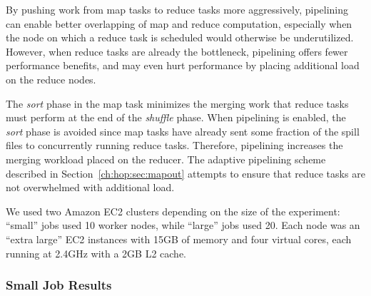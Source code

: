 By pushing work from map tasks to reduce tasks more aggressively, pipelining
can enable better overlapping of map and reduce computation, especially when
the node on which a reduce task is scheduled would otherwise be underutilized.
However, when reduce tasks are already the bottleneck, pipelining offers fewer
performance benefits, and may even hurt performance by placing additional load
on the reduce nodes.

The {\em sort} phase in the map task minimizes the merging work that reduce
tasks must perform at the end of the {\em shuffle} phase.  When pipelining is
enabled, the {\em sort} phase is avoided since map tasks have already sent some
fraction of the spill files to concurrently running reduce tasks.  Therefore,
pipelining increases the merging workload placed on the reducer.  The adaptive
pipelining scheme described in Section~\ref{ch:hop:sec:mapout} attempts to
ensure that reduce tasks are not overwhelmed with additional load.

We used two Amazon EC2 clusters depending on the size of the experiment:
``small'' jobs used 10 worker nodes, while ``large'' jobs used 20.  Each node
was an ``extra large'' EC2 instances with 15GB of memory and four virtual
cores, each running at 2.4GHz with a 2GB L2 cache.

\subsubsection{Small Job Results}

